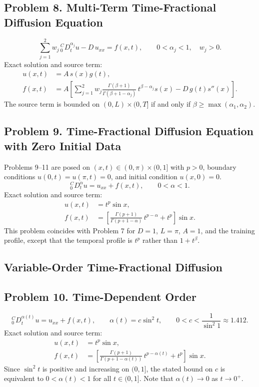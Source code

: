 \documentclass[11pt]{article}
\newcommand{\Caputo}[1]{{}^{C}_{0}D_t^{#1}}
\begin{document}
\subsection*{Problem 8. Multi-Term Time-Fractional Diffusion Equation}

\[
\boxed{
\sum_{j=1}^{2}w_j\,\Caputo{\alpha_j}u
-D\,u_{xx}=f(x,t)
},
\qquad 0<\alpha_j<1,
\quad w_j>0.
\]
Exact solution and source term:
\[
\begin{aligned}
u(x,t)&=A\,s(x)g(t),\\
f(x,t)&=
A\left[
\sum_{j=1}^{2}
w_j\frac{\Gamma(\beta+1)}
{\Gamma(\beta+1-\alpha_j)}\,
t^{\beta-\alpha_j}s(x)
-D\,g(t)s''(x)
\right].
\end{aligned}
\]
The source term is bounded on $(0,L)\times(0,T]$ if and only if
$\beta\ge\max(\alpha_1,\alpha_2)$.

\subsection*{Problem 9. Time-Fractional Diffusion Equation with Zero Initial Data}

Problems 9--11 are posed on $(x,t)\in(0,\pi)\times(0,1]$ with $p>0$,
boundary conditions $u(0,t)=u(\pi,t)=0$, and initial condition
$u(x,0)=0$.
\[
\boxed{\Caputo{\alpha}u=u_{xx}+f(x,t)},
\qquad 0<\alpha<1.
\]
Exact solution and source term:
\[
\begin{aligned}
u(x,t)&=t^p\sin x,\\
f(x,t)&=
\left[
\frac{\Gamma(p+1)}{\Gamma(p+1-\alpha)}\,
t^{p-\alpha}+t^p
\right]\sin x.
\end{aligned}
\]
This problem coincides with Problem 7 for $D=1$, $L=\pi$, $A=1$, and the
training profile, except that the temporal profile is $t^p$ rather than
$1+t^\beta$.

\subsection{Variable-Order Time-Fractional Diffusion}

\subsection*{Problem 10. Time-Dependent Order}

\[
\boxed{\Caputo{\alpha(t)}u=u_{xx}+f(x,t)},
\qquad \alpha(t)=c\sin^2 t,
\qquad 0<c<\frac{1}{\sin^2 1}\approx1.412.
\]
Exact solution and source term:
\[
\begin{aligned}
u(x,t)&=t^p\sin x,\\
f(x,t)&=
\left[
\frac{\Gamma(p+1)}{\Gamma(p+1-\alpha(t))}\,
t^{p-\alpha(t)}+t^p
\right]\sin x.
\end{aligned}
\]
Since $\sin^2 t$ is positive and increasing on $(0,1]$, the stated bound
on $c$ is equivalent to $0<\alpha(t)<1$ for all $t\in(0,1]$. Note that
$\alpha(t)\to0$ as $t\to0^+$.
\end{document}
